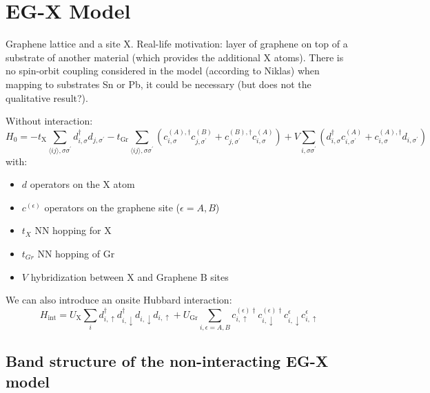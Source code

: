 \section{EG-X Model}\label{sec:eg-x-model}

Graphene lattice and a site X\@.
Real-life motivation: layer of graphene on top of a substrate of another material (which provides the additional X atoms).
There is no spin-orbit coupling considered in the model (according to Niklas) when mapping to substrates Sn or Pb, it could be necessary (but does not the qualitative result?).

Without interaction:
\begin{equation}
    H_0 = -t_{\mathrm{X}} \sum_{\langle ij \rangle, \sigma \sigma^{\prime}} d_{i, \sigma}^{\dagger} d_{j, \sigma^{\prime}}
    -t_{\mathrm{Gr}} \sum_{\langle ij \rangle, \sigma \sigma^{\prime}} \left(
    c_{i, \sigma}^{(A), \dagger} c_{j, \sigma^{\prime}}^{(B)} +
    c_{j, \sigma^{\prime}}^{(B), \dagger} c_{i, \sigma}^{(A)}
    \right)
    + V \sum_{i, \sigma \sigma^{\prime}} \left(
    d_{i, \sigma}^{\dagger} c_{i, \sigma^{\prime}}^{(A)} +
    c_{i, \sigma}^{(A), \dagger} d_{i, \sigma^{\prime}}
    \right)
    \label{eq:EG-X model Hamiltonian non-interacting}
\end{equation}
with:
\begin{itemize}
    \item \(d\) operators on the X atom
    \item \(c^{(\epsilon)}\) operators on the graphene site (\(\epsilon = A, B\))
    \item \(t_X\) NN hopping for X
    \item \(t_{Gr}\) NN hopping of Gr
    \item \(V\) hybridization between \(\mathrm{X}\) and Graphene \(\mathrm{B}\) sites
\end{itemize}
We can also introduce an onsite Hubbard interaction:
\begin{equation}
    H_{\mathrm{int}} = U_{\mathrm{X}} \sum_{i} d_{i, \uparrow}^{\dagger} d_{i, \downarrow}^{\dagger} d_{i, \downarrow} d_{i, \uparrow}
    + U_{\mathrm{Gr}} \sum_{i, \epsilon=A, B} c_{i, \uparrow}^{(\epsilon) \dagger} c_{i, \downarrow}^{(\epsilon) \dagger} c_{i, \downarrow}^{\epsilon} c_{i, \uparrow}^{\epsilon}
\end{equation}

\subsection{Band structure of the non-interacting EG-X model}\label{subsec:band-structure-of-the-non-interacting-eg-x-model}

